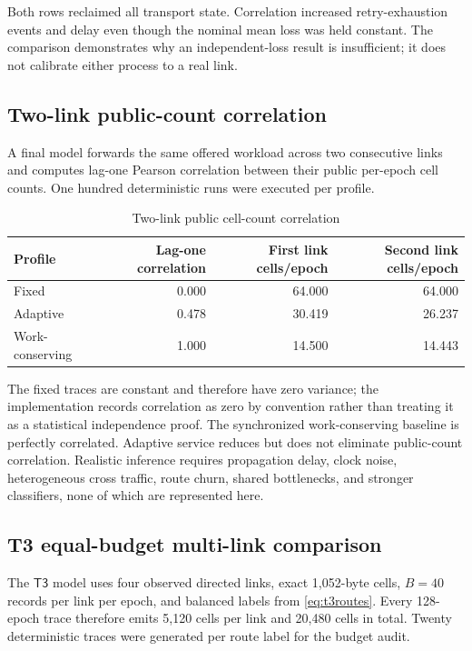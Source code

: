 \documentclass[11pt,oneside]{article}
\newcommand{\Tthree}{\ensuremath{\mathsf{T3}}}
\begin{document}
Both rows reclaimed all transport state. Correlation increased retry-exhaustion events and delay even though the nominal mean loss was held constant. The comparison demonstrates why an independent-loss result is insufficient; it does not calibrate either process to a real link.

\subsection{Two-link public-count correlation}

A final model forwards the same offered workload across two consecutive links and computes lag-one Pearson correlation between their public per-epoch cell counts. One hundred deterministic runs were executed per profile.

\begin{table}[ht]
\centering
\caption{Two-link public cell-count correlation}
\label{tab:t2correlation}
\begin{tabular}{@{}lrrr@{}}
\toprule
Profile & Lag-one correlation & First link cells/epoch & Second link cells/epoch \\
\midrule
Fixed & 0.000 & 64.000 & 64.000 \\
Adaptive & 0.478 & 30.419 & 26.237 \\
Work-conserving & 1.000 & 14.500 & 14.443 \\
\bottomrule
\end{tabular}
\end{table}

The fixed traces are constant and therefore have zero variance; the implementation records correlation as zero by convention rather than treating it as a statistical independence proof. The synchronized work-conserving baseline is perfectly correlated. Adaptive service reduces but does not eliminate public-count correlation. Realistic inference requires propagation delay, clock noise, heterogeneous cross traffic, route churn, shared bottlenecks, and stronger classifiers, none of which are represented here.



\subsection{T3 equal-budget multi-link comparison}

The \Tthree{} model uses four observed directed links, exact 1,052-byte cells, $B=40$ records per link per epoch, and balanced labels from \eqref{eq:t3routes}. Every 128-epoch trace therefore emits 5,120 cells per link and 20,480 cells in total. Twenty deterministic traces were generated per route label for the budget audit.
\end{document}
